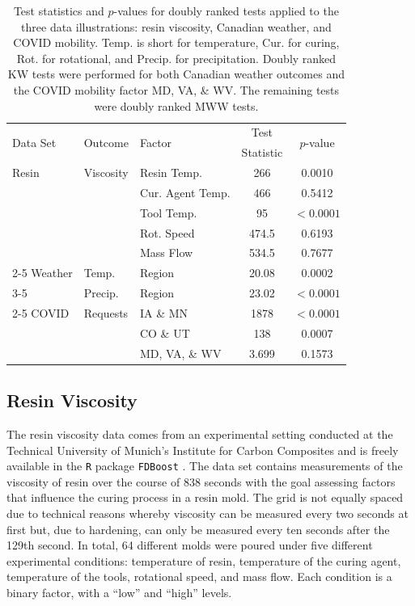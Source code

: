 \documentclass[12pt]{article}
\theoremstyle{plain}
\begin{document}
\begin{table}
\centering
\caption{ Test statistics and $p$-values for doubly ranked tests applied to the three data illustrations: resin viscosity, Canadian weather, and COVID mobility. Temp. is short for temperature, Cur. for curing, Rot. for rotational, and Precip. for precipitation. Doubly ranked KW tests were performed for both Canadian weather outcomes and the COVID mobility factor MD, VA, \& WV. The remaining tests were doubly ranked MWW tests. \label{t:data}}
\vspace{5pt}
\begin{tabular}{lllcc}
  \hline
\multirow{2}{*}{Data Set} & \multirow{2}{*}{Outcome} & \multirow{2}{*}{Factor} &  Test & \multirow{2}{*}{$p$-value}  \\
 &   &  & Statistic &  \\ 
  \hline
Resin & 
Viscosity  &  Resin Temp. & 266 & 0.0010   \\
 & & Cur. Agent Temp. & 466 & 0.5412   \\
 & & Tool Temp. & 95 & $<0.0001$   \\
& & Rot. Speed & 474.5 & 0.6193  \\
& & Mass Flow  & 534.5 & 0.7677  \\
\cline{2-5}
Weather & Temp.  &  Region & 20.08 & 0.0002   \\
\cline{3-5}
& Precip.  &  Region & 23.02 & $<0.0001$  \\ 
\cline{2-5}
COVID & Requests & IA \& MN & 1878 & $<0.0001$  \\
 & & CO \& UT & 138 & 0.0007  \\
 & & MD, VA, \& WV & 3.699 & 0.1573   \\
    \hline
\end{tabular}
\end{table}

\subsection{Resin Viscosity}

The resin viscosity data comes from an experimental setting conducted at the Technical University of Munich's Institute for Carbon Composites and is freely available in the \texttt{R} package \texttt{FDBoost} \citep{FDboost2020}. The data set contains measurements of the viscosity of resin over the course of 838 seconds with the goal assessing factors that influence the curing process in a resin mold. The grid is not equally spaced due to technical reasons whereby viscosity can be measured every two seconds at first but, due to hardening, can only be measured every ten seconds after the 129th second. In total, 64 different molds were poured under five different experimental conditions: temperature of resin, temperature of the curing agent, temperature of the tools, rotational speed, and mass flow. Each condition is a binary factor, with a ``low'' and ``high'' levels.
\end{document}
